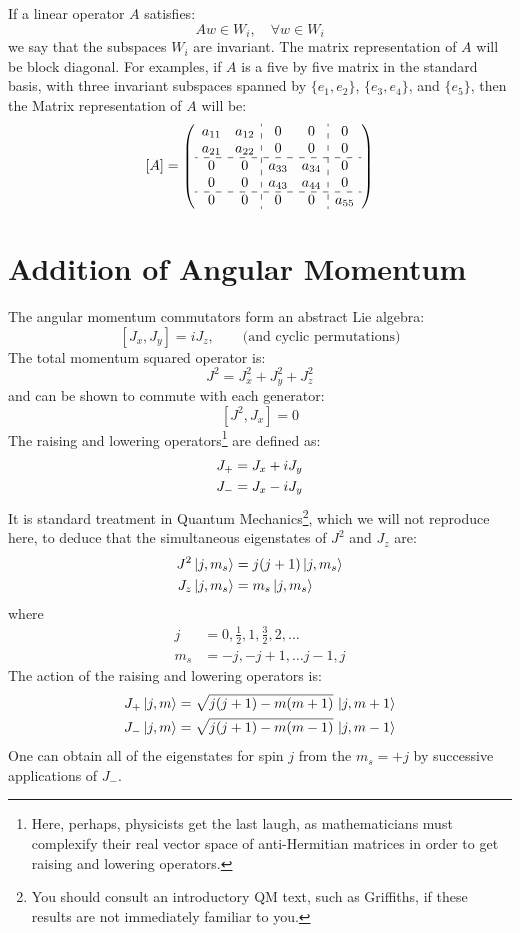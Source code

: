 \documentclass[12pt]{article}
\begin{document}
If a linear operator $A$ satisfies:
$$A w \in W_i, \quad \forall w \in W_i$$
we say that the subspaces ${W_i}$ are invariant.  The matrix representation of $A$ will be block diagonal.  For examples, if $A$ is a five by five matrix in the standard basis,
with three invariant subspaces spanned by $\{e_1, e_2\}$, $\{e_3,e_4\}$,
and $\{e_5\}$, then the Matrix representation of $A$ will be:
$$
[A] = 
\left(\begin{array}{cc:cc:c}
a_{11} & a_{12} & 0 & 0 & 0 \\
a_{21} & a_{22} & 0 & 0 & 0 \\
\hdashline
0 & 0 & a_{33} & a_{34} & 0 \\
0 & 0 & a_{43} & a_{44} & 0 \\
\hdashline
0 & 0 & 0 & 0 & a_{55}
\end{array}\right)
$$


\section{Addition of Angular Momentum}

The angular momentum commutators form an abstract Lie algebra:
\begin{equation}
\label{eqn:spin-lie-algebra}
[J_x, J_y] = i J_z, \quad \quad \text{(and cyclic permutations)}
\end{equation}
The total momentum squared operator is:
$$J^2 = J_x^2 + J_y^2 + J_z^2$$
and can be shown to commute with each generator:
$$[J^2,J_x] = 0$$
The raising and lowering operators\footnote{Here,
perhaps, physicists get the last laugh, as mathematicians must
complexify their real vector space of anti-Hermitian matrices in order
to get raising and lowering operators.} are defined as:
\begin{align}
  J_+ &= J_x + i J_y \notag \\
  J_- &= J_x - i J_y
\end{align}
It is standard treatment in Quantum Mechanics\footnote{You should
consult an introductory QM text, such as Griffiths, if these results
are not immediately familiar to you.}, which we will not reproduce
here, to deduce that the simultaneous eigenstates of $J^2$ and $J_z$
are:
\begin{align}
J^2 \ket{j,m_s} &= j(j+1) \ket{j,m_s} \notag \\
\label{eqn:angular-momentum-observables} 
J_z \ket{j,m_s} &= m_s \ket{j,m_s}
\end{align}
where
\begin{align*}
j &= 0,\frac{1}{2},1,\frac{3}{2},2,\ldots\\
m_s &= -j, -j+1, \ldots j-1, j
\end{align*}
The action of the raising and lowering operators is:
\begin{align}
  J_+\ket{j,m} &= \sqrt{j(j+1) - m(m+1)}\,\ket{j,m+1} \notag \\
  \label{eqn:raising-operators}
  J_-\ket{j,m} &= \sqrt{j(j+1) - m(m-1)}\,\ket{j,m-1}
\end{align}
One can obtain all of the eigenstates for spin $j$ from the $m_s=+j$
by successive applications of $J_-$.
\end{document}
